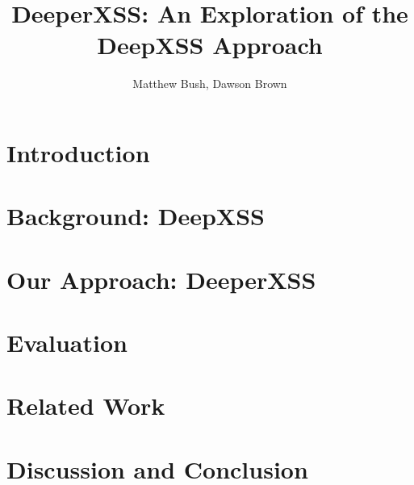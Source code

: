 \documentclass[sigconf]{acmart}
\begin{document}
\title{DeeperXSS: An Exploration of the DeepXSS Approach}

\author{Matthew Bush, Dawson Brown}




\begin{abstract}

\end{abstract}


\maketitle


\section{Introduction}
\label{sec:introduction}


\section{Background: DeepXSS}
\label{sec:background}


\section{Our Approach: DeeperXSS}
\label{sec:method}


\section{Evaluation}
\label{sec:evaluation}


\section{Related Work}
\label{sec:related}


\section{Discussion and Conclusion}
\label {sec:conclusion}




\end{document}
